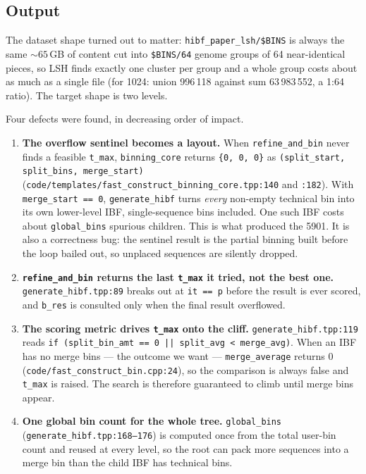 \documentclass[11pt,a4paper]{article}
\newcommand{\code}[1]{\lstinline[basicstyle=\ttfamily\small]!#1!}
\begin{document}
\subsection*{Output}

The dataset shape turned out to matter: \texttt{hibf\_paper\_lsh/\$BINS} is always the same
${\sim}65$\,GB of content cut into \texttt{\$BINS/64} genome groups of 64 near-identical pieces, so
LSH finds exactly one cluster per group and a whole group costs about as much as a single file
(for 1024: union 996\,118 against sum 63\,983\,552, a 1:64 ratio). The target shape is two levels.

Four defects were found, in decreasing order of impact.

\begin{enumerate}[leftmargin=*]
\item \textbf{The overflow sentinel becomes a layout.} When \code{refine_and_bin} never finds a
feasible \code{t_max}, \code{binning_core} returns \code{{0, 0, 0}} as
\code{(split_start, split_bins, merge_start)}
(\texttt{code/templates/fast\_construct\_binning\_core.tpp:140} and \texttt{:182}). With
\code{merge_start == 0}, \code{generate_hibf} turns \emph{every} non-empty technical bin into its
own lower-level IBF, single-sequence bins included. One such IBF costs about \code{global_bins}
spurious children. This is what produced the 5901. It is also a correctness bug: the sentinel
result is the partial binning built before the loop bailed out, so unplaced sequences are silently
dropped.

\item \textbf{\code{refine_and_bin} returns the last \code{t_max} it tried, not the best one.}
\texttt{generate\_hibf.tpp:89} breaks out at \code{it == p} before the result is ever scored, and
\code{b_res} is consulted only when the final result overflowed.

\item \textbf{The scoring metric drives \code{t_max} onto the cliff.}
\texttt{generate\_hibf.tpp:119} reads
\code{if (split_bin_amt == 0 || split_avg < merge_avg)}. When an IBF has no merge bins ---
the outcome we want --- \code{merge_average} returns 0
(\texttt{code/fast\_construct\_bin.cpp:24}), so the comparison is always false and \code{t_max}
is raised. The search is therefore guaranteed to climb until merge bins appear.

\item \textbf{One global bin count for the whole tree.} \code{global_bins}
(\texttt{generate\_hibf.tpp:168--176}) is computed once from the total user-bin count and reused
at every level, so the root can pack more sequences into a merge bin than the child IBF has
technical bins.
\end{enumerate}
\end{document}
